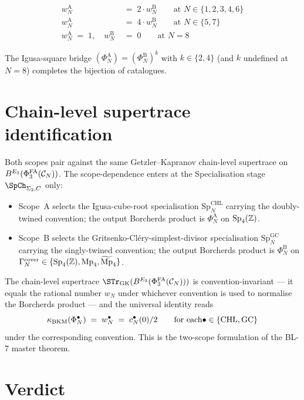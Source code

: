 \begin{align*}
 w_N^{\mathrm A} &\;=\; 2 \cdot w_N^{\mathrm B} \qquad
   \text{at $N \in \{1, 2, 3, 4, 6\}$} \\
 w_N^{\mathrm A} &\;=\; 4 \cdot w_N^{\mathrm B} \qquad
   \text{at $N \in \{5, 7\}$} \\
 w_N^{\mathrm A} \;=\; 1, \quad w_N^{\mathrm B} &\;=\; 0 \qquad
   \text{at $N = 8$}
\end{align*}

The Igusa-square bridge $(\Phi_N^{\mathrm A}) = (\Phi_N^{\mathrm B})^k$
with $k \in \{2, 4\}$ (and $k$ undefined at $N = 8$) completes the
bijection of catalogues.

\section*{Chain-level supertrace identification}

Both scopes pair against the same Getzler--Kapranov chain-level
supertrace on $B^{E_{3}}(\Phi^{\mathrm{FA}}_3(\mathcal C_N))$. The scope-dependence enters
at the Specialisation stage $\SpCh_{\Sigma_2, C}$ only:

\begin{itemize}
\item Scope~A selects the Igusa-cube-root specialisation
$\mathrm{Sp}^{\mathrm{CHL}}_N$ carrying the doubly-twined convention;
the output Borcherds product is $\Phi_N^{\mathrm A}$ on $\mathrm{Sp}_4(\mathbb Z)$.
\item Scope~B selects the Gritsenko-Cl\'ery-simplest-divisor
specialisation $\mathrm{Sp}^{\mathrm{GC}}_N$ carrying the
singly-twined convention; the output Borcherds product is
$\Phi_N^{\mathrm B}$ on $\Gamma_N^{\mathrm{cover}} \in \{\mathrm{Sp}_4(\mathbb Z),
\mathrm{Mp}_4, \widetilde{\mathrm{Mp}}_4\}$.
\end{itemize}

The chain-level supertrace $\STr_{\mathrm{GK}}(\BE{3}(\PhiFAt(\Cker_N)))$
is convention-invariant --- it equals the rational number $w_N$ under
whichever convention is used to normalise the Borcherds product ---
and the universal identity reads
\[
 \kappa_{\mathrm{BKM}}(\Phi_N^\bullet) \;=\; w_N^\bullet \;=\; c_N^\bullet(0)/2
 \qquad\text{for each} \bullet \in \{\mathrm{CHL}, \mathrm{GC}\}
\]
under the corresponding convention. This is the two-scope formulation
of the BL-7 master theorem.

\section*{Verdict}

